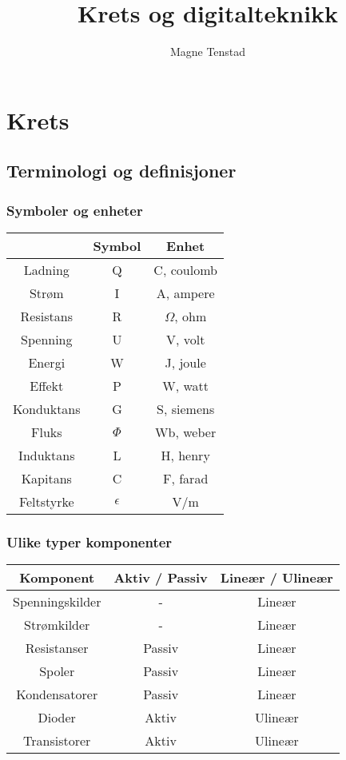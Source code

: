 \documentclass{article}
\title{Krets og digitalteknikk}
\author{Magne Tenstad}
\begin{document}
\maketitle

\clearpage

\tableofcontents

\clearpage

\section{Krets}


\subsection{Terminologi og definisjoner}


\subsubsection{Symboler og enheter}
\begin{table}[h]
    \centering
    \begin{tabular}{c|c|c}
                    & Symbol & Enhet \\
        \hline
        Ladning     & Q & C, coulomb \\
        Strøm       & I & A, ampere \\
        Resistans   & R & $\Omega$, ohm \\
        Spenning    & U & V, volt \\
        Energi      & W & J, joule \\
        Effekt      & P & W, watt \\
        Konduktans  & G & S, siemens \\
        Fluks       & $\Phi$ & Wb, weber \\
        Induktans   & L & H, henry \\
        Kapitans    & C & F, farad \\
        Feltstyrke  & $\epsilon$ & V/m
    \end{tabular}
\end{table}

\subsubsection{Ulike typer komponenter}
\begin{table}[h]
    \centering
    \begin{tabular}{c|c|c}
    Komponent       & Aktiv / Passiv    & Lineær / Ulineær \\
    \hline
    Spenningskilder & -         & Lineær\\
    Strømkilder     & -         & Lineær\\
    Resistanser     & Passiv    & Lineær\\
    Spoler          & Passiv    & Lineær\\
    Kondensatorer   & Passiv    & Lineær\\
    Dioder          & Aktiv     & Ulineær\\
    Transistorer    & Aktiv     & Ulineær
    \end{tabular}
\end{table}
\end{document}
